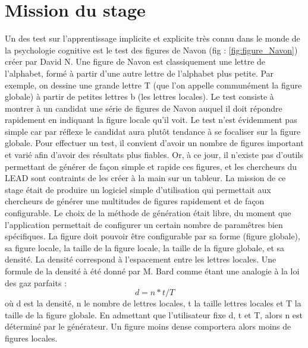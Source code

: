 \documentclass{article}
\begin{document}
\section{Mission du stage}
Un des test sur l'apprentissage implicite et explicite très connu dans le monde de la psychologie cognitive est le test des figures de Navon (fig : \ref{fig:figure_Navon}) créer par David N. Une figure de Navon est classiquement une lettre de l'alphabet, formé à partir d'une autre lettre de l'alphabet plus petite. Par exemple, on dessine une grande lettre T (que l'on appelle communément la figure globale) à partir de petites lettres b (les lettres locales). Le test consiste à montrer à un candidat une série de figures de Navon auquel il doit répondre rapidement en indiquant la figure locale qu'il voit. Le test n'est évidemment pas simple car par réflexe le candidat aura plutôt tendance à se focaliser sur la figure globale.
Pour effectuer un test, il convient d'avoir un nombre de figures important et varié afin d'avoir des résultats plus fiables. Or, à ce jour, il n'existe pas d'outils permettant de générer de façon simple et rapide ces figures, et les chercheurs du LEAD sont contraints de les créer à la main sur un tableur. 
La mission de ce stage était de produire un logiciel simple d'utilisation qui permettait aux chercheurs de générer une multitudes de figures rapidement et de façon configurable. Le choix de la méthode de génération était libre, du moment que l'application permettait de configurer un certain nombre de paramêtres bien spécifiques. La figure doit pouvoir être configurable par sa forme (figure globale), sa figure locale, la taille de la figure locale, la taille de la figure globale, et sa densité. La densité correspond à l'espacement entre les lettres locales. Une formule de la densité à été donné par M. Bard comme étant une analogie à la loi des gaz parfaits : \label{formule:equation_densité}\[d = n * t / T\] où d est la densité, n le nombre de lettres locales, t la taille lettres locales et T la taille de la figure globale. En admettant que l'utilisateur fixe d, t et T, alors n est déterminé par le générateur. Un figure moins dense comportera alors moins de figures locales.
\end{document}
